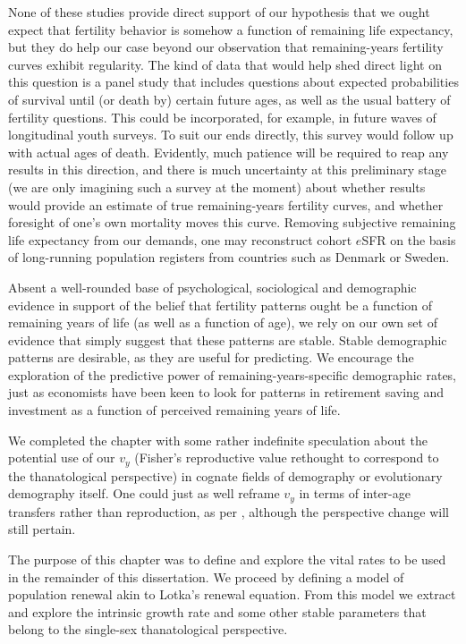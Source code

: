 None of these studies provide
direct support of our hypothesis that we ought expect that fertility behavior is
somehow a function of remaining life expectancy, but they do help our case
beyond our observation that remaining-years fertility curves exhibit regularity. 
The kind of data that would help shed direct light on this question is a
panel study that includes questions about expected probabilities of survival 
until (or death by) certain future ages, as well as the usual battery of fertility 
questions. This could be incorporated, for example, in future waves of
longitudinal youth surveys. To suit our ends directly, this survey would follow
up with actual ages of death. Evidently, much patience will be required to reap
any results in this direction, and there is much uncertainty at this preliminary
stage (we are only imagining such a survey at the moment) about whether results
would provide an estimate of true remaining-years fertility curves, and whether
foresight of one's own mortality moves this curve. Removing subjective
remaining life expectancy from our demands, one may reconstruct cohort $e$SFR on 
the basis of long-running population registers from countries such as Denmark or
Sweden.

Absent a well-rounded base of psychological, sociological and demographic
evidence in support of the belief that fertility patterns ought be a function of
remaining years of life (as well as a function of age), we rely on our own
set of evidence that simply suggest that these patterns are stable. Stable
demographic patterns are desirable, as they are useful for predicting. We encourage
the exploration of the predictive power of remaining-years-specific
demographic rates, just as economists have been keen to look for patterns in
retirement saving and investment as a function of perceived remaining years of
life.

We completed the chapter with some rather indefinite speculation about the
potential use of our $v_y$ (Fisher's reproductive value rethought to correspond
to the thanatological perspective) in cognate fields of demography or
evolutionary demography itself. One could just as well reframe $v_y$ in terms of
inter-age transfers rather than reproduction, as per \citet{lee2003rethinking},
although the perspective change will still pertain.

The purpose of this chapter was to define and explore the vital rates to be used
in the remainder of this dissertation. We proceed by defining a model of
population renewal akin to Lotka's renewal equation. From this model we
extract and explore the intrinsic growth rate and some other stable
parameters that belong to the single-sex thanatological perspective. 

\FloatBarrier


